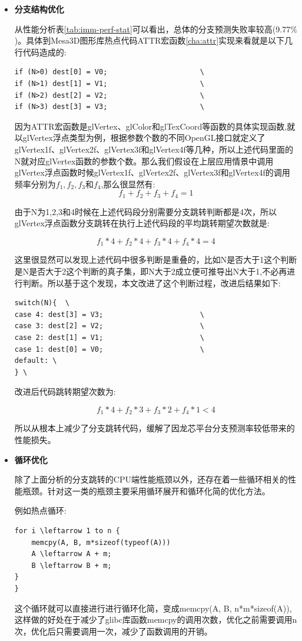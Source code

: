 \begin{itemize}

\item{\textbf{分支结构优化}}

从性能分析表\ref{tab:imm-perf-stat}可以看出，总体的分支预测失败率较高(9.77$\%$)。具体到Mesa3D图形库热点代码ATTR宏函数\ref{cha:attr}实现来看就是以下几行代码造成的:

\begin{lstlisting}
if (N>0) dest[0] = V0;						\
if (N>1) dest[1] = V1;						\
if (N>2) dest[2] = V2;						\
if (N>3) dest[3] = V3;						\
\end{lstlisting}

因为ATTR宏函数是glVertex、glColor和glTexCoord等函数的具体实现函数,就以glVertex浮点类型为例，根据参数个数的不同OpenGL接口就定义了glVertex1f、glVertex2f、glVertex3f和glVertex4f等几种，所以上述代码里面的N就对应glVertex函数的参数个数。那么我们假设在上层应用情景中调用glVertex浮点函数时候glVertex1f、glVertex2f、glVertex3f和glVertex4f的调用频率分别为$f_1, f_2, f_3和f_4$,那么很显然有:
$$
f_1 + f_2 + f_3 + f_4 = 1
$$

由于N为1,2,3和4时候在上述代码段分别需要分支跳转判断都是4次，所以glVertex浮点函数分支跳转在执行上述代码段的平均跳转期望次数就是:

$$f_1*4 + f_2*4 + f_3*4 + f_4*4 = 4$$

这里很显然可以发现上述代码中很多判断是重叠的，比如N是否大于1这个判断是N是否大于2这个判断的真子集，即N大于2成立便可推导出N大于1,不必再进行判断。所以基于这个发现，本文改进了这个判断过程，改进后结果如下:

\begin{lstlisting}
switch(N){	\
case 4: dest[3] = V3;						\
case 3: dest[2] = V2;						\
case 2: dest[1] = V1;						\
case 1: dest[0] = V0;						\
default: \
} \
\end{lstlisting}

改进后代码跳转期望次数为:

$$f_1 * 4 + f_2 * 3 + f_3 * 2 + f_4 * 1 < 4$$

所以从根本上减少了分支跳转代码，缓解了因龙芯平台分支预测率较低带来的性能损失。

\item{\textbf{循环优化}}

除了上面分析的分支跳转的CPU端性能瓶颈以外，还存在着一些循环相关的性能瓶颈。针对这一类的瓶颈主要采用循环展开和循环化简的优化方法。

例如热点循环:
\begin{lstlisting}
for i \leftarrow 1 to n {
	memcpy(A, B, m*sizeof(typeof(A)))
	A \leftarrow A + m;
	B \leftarrow B + m;
}
}
\end{lstlisting}
这个循环就可以直接进行进行循环化简，变成memcpy(A, B, n*m*sizeof(A)),这样做的好处在于减少了glibc库函数memcpy的调用次数，优化之前需要调用n次，优化后只需要调用一次，减少了函数调用的开销。


\end{itemize}
